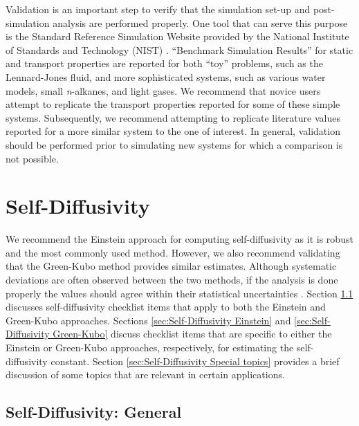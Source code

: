 \documentclass[9pt,bestpractices]{livecoms}
\begin{document}
Validation is an important step to verify that the simulation set-up and post-simulation analysis are performed properly. One tool that can serve this purpose is the Standard Reference Simulation Website provided by the National Institute of Standards and Technology (NIST) \cite{ShenSRSW}. ``Benchmark Simulation Results'' for static and transport properties are reported for both ``toy'' problems, such as the Lennard-Jones fluid, and more sophisticated systems, such as various water models, small \textit{n}-alkanes, and light gases. We recommend that novice users attempt to replicate the transport properties reported for some of these simple systems. Subsequently, we recommend attempting to replicate literature values reported for a more similar system to the one of interest. In general, validation should be performed prior to simulating new systems for which a comparison is not possible.

\section{Self-Diffusivity} \label{sec:Self-Diffusivity}

We recommend the Einstein approach for computing self-diffusivity as it is robust and the most commonly used method. However, we also recommend validating that the Green-Kubo method provides similar estimates. Although systematic deviations are often observed between the two methods, if the analysis is done properly the values should agree within their statistical uncertainties \cite{Kondratyuk2016,Liu2012,Mondello1997}. Section \ref{sec:Self-Diffusivity General} discusses self-diffusivity checklist items that apply to both the Einstein and Green-Kubo approaches. Sections \ref{sec:Self-Diffusivity Einstein} and \ref{sec:Self-Diffusivity Green-Kubo} discuss checklist items that are specific to either the Einstein or Green-Kubo approaches, respectively, for estimating the self-diffusivity constant. Section \ref{sec:Self-Diffusivity Special topics} provides a brief discussion of some topics that are relevant in certain applications.

\subsection{Self-Diffusivity: General} \label{sec:Self-Diffusivity General}

\end{document}
